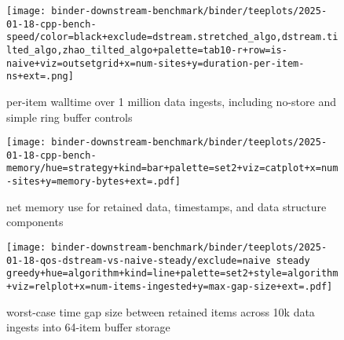 \begin{figure*}

\begin{subfigure}{\textwidth}
\centering
\texttt{[image: binder-downstream-benchmark/binder/teeplots/2025-01-18-cpp-bench-speed/color=black+exclude=dstream.stretched\_algo,dstream.tilted\_algo,zhao\_tilted\_algo+palette=tab10-r+row=is-naive+viz=outsetgrid+x=num-sites+y=duration-per-item-ns+ext=.png]}
\caption{per-item walltime over 1 million data ingests, including no-store and simple ring buffer controls}
\label{fig:perf:speed}
\end{subfigure}

\begin{subfigure}{0.38\textwidth}
\texttt{[image: binder-downstream-benchmark/binder/teeplots/2025-01-18-cpp-bench-memory/hue=strategy+kind=bar+palette=set2+viz=catplot+x=num-sites+y=memory-bytes+ext=.pdf]}
\centering
\begin{minipage}{0.9\textwidth}
\caption{net memory use for retained data, timestamps, and data structure components}
\label{fig:perf:memory}
\end{minipage}
\end{subfigure}%
\begin{subfigure}{0.62\textwidth}
\texttt{[image: binder-downstream-benchmark/binder/teeplots/2025-01-18-qos-dstream-vs-naive-steady/exclude=naive steady greedy+hue=algorithm+kind=line+palette=set2+style=algorithm+viz=relplot+x=num-items-ingested+y=max-gap-size+ext=.pdf]}
\centering
\begin{minipage}{0.9\textwidth}
\caption{worst-case time gap size between retained items across 10k data ingests into 64-item buffer storage}
\label{fig:perf:qos}
\end{minipage}
\end{subfigure}


\end{figure*}

